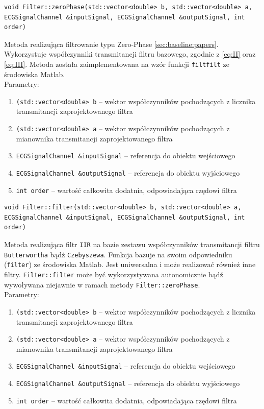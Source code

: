 \documentclass[a4paper, 11pt]{article}
\begin{document}
\begin{lstlisting}
void Filter::zeroPhase(std::vector<double> b, std::vector<double> a,
ECGSignalChannel &inputSignal, ECGSignalChannel &outputSignal, int order)
\end{lstlisting}
Metoda realizująca filtrowanie typu Zero-Phase \ref{sec:baseline:papers}. Wykorzystuje współczynniki transmitancji filtru bazowego, zgodnie z \eqref{eq:II} oraz \eqref{eq:III}. Metoda została zaimplementowana na wzór funkcji \verb|filtfilt| ze środowiska Matlab.\\

Parametry:
\begin{enumerate}
\item \verb|(std::vector<double> b|  -- wektor współczynników pochodzących z licznika transmitancji zaprojektowanego filtra
\item \verb|(std::vector<double> a|  -- wektor współczynników pochodzących z mianownika transmitancji zaprojektowanego filtra
\item \verb|ECGSignalChannel &inputSignal|  -- referencja do obiektu wejściowego
\item \verb|ECGSignalChannel &outputSignal|  -- referencja do obiektu wyjściowego
\item \verb|int order|  -- wartość całkowita dodatnia, odpowiadająca rzędowi filtra
\end{enumerate}

\begin{lstlisting}
void Filter::filter(std::vector<double> b, std::vector<double> a,
ECGSignalChannel &inputSignal, ECGSignalChannel &outputSignal, int order)
\end{lstlisting}

Metoda realizująca filtr \verb|IIR| na bazie zestawu współczynników transmitancji filtru \verb|Butterwortha| bądź \verb|Czebyszewa|. Funkcja bazuje na swoim odpowiedniku (\verb|filter|) ze środowiska Matlab. Jest uniwersalna i może realizować również inne filtry. \verb|Filter::filter| może być wykorzystywana autonomicznie bądź wywoływana niejawnie w ramach metody \verb|Filter::zeroPhase|.\\

Parametry:
\begin{enumerate}
\item \verb|(std::vector<double> b|  -- wektor współczynników pochodzących z licznika transmitancji zaprojektowanego filtra
\item \verb|(std::vector<double> a|  -- wektor współczynników pochodzących z mianownika transmitancji zaprojektowanego filtra
\item \verb|ECGSignalChannel &inputSignal|  -- referencja do obiektu wejściowego
\item \verb|ECGSignalChannel &outputSignal|  -- referencja do obiektu wyjściowego
\item \verb|int order|  -- wartość całkowita dodatnia, odpowiadająca rzędowi filtra
\end{enumerate}
\end{document}
